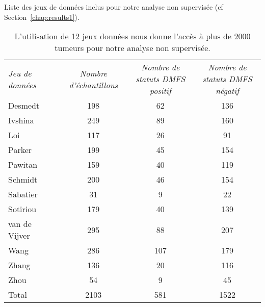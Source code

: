 			\begin{table}
				\begin{center}
					\caption{Liste des jeux de données inclus pour notre analyse non supervisée (cf Section~\ref{chap:results1}).}
					\begin{tabular}{lcccc}
						\toprule
						\multirow{2}{3cm}{\emph{Jeu de données}}	&  & \multirow{2}{3cm}{\centering\emph{Nombre d'échantillons}}	& \multirow{2}{3cm}{\centering\emph{Nombre de statuts \acs{DMFS} positif}} & \multirow{2}{3cm}{\centering\emph{Nombre de statuts \acs{DMFS} négatif}} \\
						&&&&\\
						\midrule
						Desmedt			& \citep{Desmedt2008}		& 198	& 62	&	136		\\
						Ivshina			& \citep{Ivshina2006}		& 249	& 89	&	160		\\
						Loi				& \citep{Loi2008}			& 117	& 26	&	91		\\
						Parker			& \citep{Parker2009}		& 199	& 45	&	154		\\
						Pawitan			& \citep{Pawitan2005}		& 159	& 40	&	119		\\
						Schmidt			& \citep{Schmidt2008}		& 200	& 46	&	154		\\
						Sabatier		& \citep{Sabatier2011}		& 31	& 9		&	22		\\
						Sotiriou		& \citep{Sotiriou2009}		& 179	& 40	&	139		\\
						van de Vijver	& \citep{vandevijver2002}	& 295	& 88	&	207		\\
						Wang			& \citep{Wang2005}			& 286	& 107	&	179		\\
						Zhang			& \citep{Zhang2009a}		& 136	& 20	&	116		\\
						Zhou			& \citep{Zhou2007}			& 54	& 9		&	45		\\
						\midrule
						Total			&							& 2103	& 581	&	1522	\\
						\bottomrule
					\end{tabular}
					\label{tab:Met:DSNS}
					\vspace{3ex}
					\caption*{L'utilisation de 12 jeux données nous donne l'accès à plus de 2000 tumeurs pour notre analyse non supervisée.}
				\end{center}
			\end{table}


